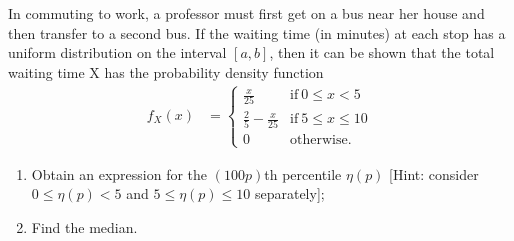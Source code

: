 \documentclass[10pt]{article}
\newenvironment{problem}[2][Problem]{\begin{trivlist}
\item[\hskip \labelsep {\bfseries #1}\hskip \labelsep {\bfseries #2.}]}{\end{trivlist}}
\begin{document}
%

\begin{problem}{4}
In commuting to work, a professor must first get on a bus near her house and then transfer to a second bus. If the waiting time (in minutes) at each stop has a uniform distribution on the interval $[a,b]$, then it can be shown that the total waiting time X has the probability density function
\begin{align*}
    f_X(x) &= 
    \begin{cases}
      \frac{x}{25} & \text{if}\ 0 \leq x < 5 \\
      \frac{2}{5} -\frac{x}{25} & \text{if}\ 5 \leq x \leq 10 \\
      0 & \text{otherwise.}
    \end{cases}
\end{align*}
\begin{enumerate}[label=(\alph*)]
\item Obtain an expression for the $(100p)$th percentile $\eta(p)$ [Hint: consider $0 \leq \eta(p) < 5$ and $5 \leq \eta(p) \leq 10$ separately];
\item Find the median.
\end{enumerate}
\end{problem}
\end{document}

